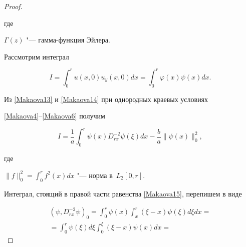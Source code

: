 \begin{proof}
\[\]








где 

$\Gamma(z)$  "--- гамма-функция Эйлера.



Рассмотрим интеграл

\begin{equation}

\label{Makaova14} 

I=\int _0^r u(x,0) u_y(x,0) dx=\int _0^r \varphi(x) \psi(x) dx.

\end{equation} 

Из \eqref{Makaova13} и \eqref{Makaova14} при однородных краевых условиях 

\eqref{Makaova4}--\eqref{Makaova6}  получим

\begin{equation}

\label{Makaova15} 

I=\frac{1}{a} \int _0^r 

\psi(x)

D_{rx}^{-2} \psi(\xi)d x

-\frac{b}{a}\|\psi(x)\|^2_0,

\end{equation}

где

$\displaystyle \|f\|^2_0=\int _0^r f^2(x)dx$  "---  норма в~$L_2[0,r]$.



Интеграл, стоящий в правой части равенства \eqref{Makaova15}, перепишем  в виде

\begin{multline}

(\psi, D^{-2}_{rx}\psi)_0 =

\int _0^r \psi(x)  \int _x^r (\xi-x) \psi(\xi) d\xi d x=

\\

=

\int _0^r \psi(\xi)d\xi  \int _0^\xi (\xi-x) \psi(x) d x  =


\end{multline}
\end{proof}

